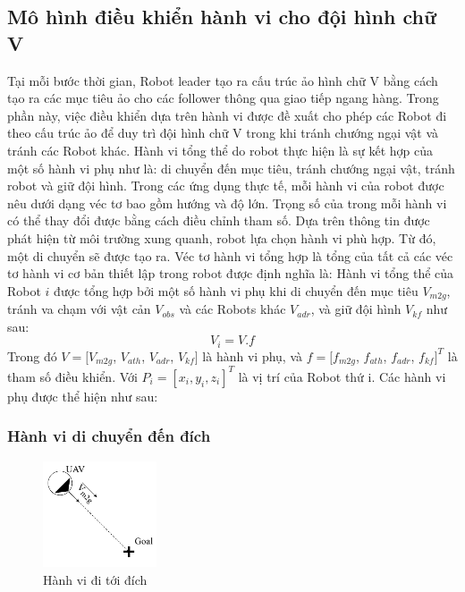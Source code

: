\subsection{Mô hình điều khiển hành vi cho đội hình chữ V}
\label{sec:tra}
Tại mỗi bước thời gian, Robot leader tạo ra cấu trúc ảo hình chữ V bằng cách tạo ra các mục tiêu ảo cho các follower thông qua giao tiếp ngang hàng. Trong phần này, việc điều khiển dựa trên hành vi được đề xuất cho phép các Robot đi theo cấu trúc ảo để duy trì đội hình chữ V trong khi tránh chướng ngại vật và tránh các Robot khác. Hành vi tổng thể do robot thực hiện là sự kết hợp của một số hành vi phụ như là: di chuyển đến mục tiêu, tránh chướng ngại vật, tránh robot và giữ đội hình. Trong các ứng dụng thực tế, mỗi hành vi của robot được nêu dưới dạng véc tơ bao gồm hướng và độ lớn. Trọng số của trong mỗi hành vi có thể thay đổi được bằng cách điều chỉnh tham số. Dựa trên thông tin được phát hiện từ môi trường xung quanh, robot lựa chọn hành vi phù hợp. Từ đó, một di chuyển sẽ được tạo ra. Véc tơ hành vi tổng hợp là tổng của tất cả các véc tơ hành vi cơ bản thiết lập trong robot được định nghĩa là: Hành vi tổng thể của Robot $i$ được tổng hợp bởi một số hành vi phụ khi di chuyển đến mục tiêu $V_{m2g}$, tránh va chạm với vật cản $V_{obs}$ và các Robots khác $V_{adr}$, và giữ đội hình $V_{kf}$ như sau:
\begin{equation}
    V_i=V.f
\label{eq:v}
\end{equation}
Trong đó $V=[V_{m2g}$, $V_{ath}$, $V_{adr}$, $V_{kf}]$ là hành vi phụ, và $f=[f_{m2g}$, $f_{ath}$, $f_{adr}$, $f_{kf}]^T$ là tham số điều khiển. Với $P_i=[x_i, y_i,z_i]^T$ là vị trí của Robot thứ i. Các hành vi phụ được thể hiện như sau:

\subsubsection{Hành vi di chuyển đến đích}
\begin{figure}[h]
    \centering
    \includegraphics[width = 0.3\textwidth]{chapter3/image/Behavior_m2g_cropped.pdf}
    \caption{Hành vi đi tới đích}
    \label{fig:m2g}
\end{figure}

